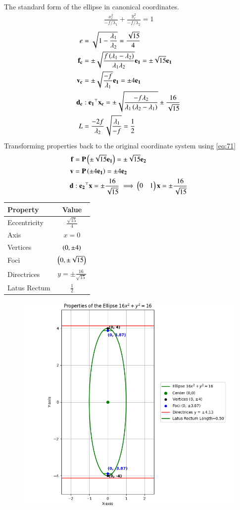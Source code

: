 \documentclass[journal]{IEEEtran}
\begin{document}
The standard form of the ellipse in canonical coordinates.
\begin{align}
    \frac{x_c^2}{-f/\lambda_1} + \frac{y_c^2}{-f/\lambda_2} = 1
\end{align}
\begin{align}
    e &= \sqrt{1 - \frac{\lambda_1}{\lambda_2}} = \frac{\sqrt{15}}{4} \\
    \mathbf{f_c} &= \pm\sqrt{\frac{f\left(\lambda_1 - \lambda_2\right)}{\lambda_1\lambda_2}}\mathbf{e_1} = \pm\sqrt{15}\mathbf{e_1} \\
    \mathbf{v_c} &= \pm\sqrt{\frac{-f}{\lambda_1}}\mathbf{e_1} = \pm 4\mathbf{e_1} \\
    \mathbf{d_c} &: \mathbf{e_1}^\top\mathbf{x_c} = \pm\sqrt{\frac{-f\lambda_2}{\lambda_1\left(\lambda_2-\lambda_1\right)}} \pm\frac{16}{\sqrt{15}} \\
    L &= \frac{-2f}{\lambda_2}\sqrt{\frac{\lambda_1}{-f}} = \frac{1}{2}
\end{align}
Transforming properties back to the original coordinate system using \eqref{eq:71}
\begin{align}
    \mathbf{f} &= \mathbf{P}\left(\pm \sqrt{15}\mathbf{e_1}\right) = \pm \sqrt{15}\mathbf{e_2} \\
    \mathbf{v} &= \mathbf{P}\left(\pm 4\mathbf{e_1}\right) = \pm 4\mathbf{e_2} \\
    \mathbf{d} &: \mathbf{e_2}^\top\mathbf{x} = \pm \frac{16}{\sqrt{15}} \implies \begin{pmatrix}0 & 1\end{pmatrix}\mathbf{x} = \pm \frac{16}{\sqrt{15}}
\end{align}
\begin{center}
\begin{tabular}{|l|c|}
    \hline
    \textbf{Property} & \textbf{Value} \\
    \hline
    Eccentricity & $\frac{\sqrt{15}}{4}$ \\
    \hline
    Axis & $x=0$ \\
    \hline
    Vertices & $\left(0, \pm 4\right)$ \\
    \hline
    Foci & $\left(0, \pm \sqrt{15}\right)$ \\
    \hline
    Directrices & $y = \pm \frac{16}{\sqrt{15}}$ \\
    \hline
    Latus Rectum & $\frac{1}{2}$ \\
    \hline
\end{tabular}
\end{center}






\begin{figure}[H]
	\centering
	\includegraphics[width=0.8\columnwidth]{figs/fig1.png}
	\caption{}
	\label{fig:1}
\end{figure}
\end{document}
